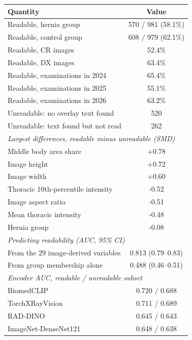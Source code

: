 \begin{tabular}{lc}
\toprule
Quantity & Value \\
\midrule
Readable, hernia group & 570 / 981 (58.1\%) \\
Readable, control group & 608 / 979 (62.1\%) \\
Readable, CR images & 52.4\% \\
Readable, DX images & 63.4\% \\
Readable, examinations in 2024 & 65.4\% \\
Readable, examinations in 2025 & 55.1\% \\
Readable, examinations in 2026 & 63.2\% \\
Unreadable: no overlay text found & 520 \\
Unreadable: text found but not read & 262 \\
\midrule
\multicolumn{2}{l}{\emph{Largest differences, readable minus unreadable (SMD)}} \\
Middle body area share & +0.78 \\
Image height & +0.72 \\
Image width & +0.60 \\
Thoracic 10th-percentile intensity & -0.52 \\
Image aspect ratio & -0.51 \\
Mean thoracic intensity & -0.48 \\
Hernia group & -0.08 \\
\midrule
\multicolumn{2}{l}{\emph{Predicting readability (AUC, 95\% CI)}} \\
From the 29 image-derived variables & 0.813 (0.79--0.83) \\
From group membership alone & 0.488 (0.46--0.51) \\
\midrule
\multicolumn{2}{l}{\emph{Encoder AUC, readable / unreadable subset}} \\
BiomedCLIP & 0.720 / 0.688 \\
TorchXRayVision & 0.711 / 0.689 \\
RAD-DINO & 0.645 / 0.643 \\
ImageNet-DenseNet121 & 0.648 / 0.638 \\
\bottomrule
\end{tabular}
